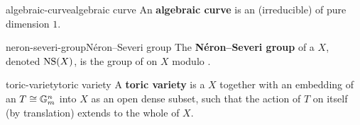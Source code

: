 \begin{topic}{algebraic-curve}{algebraic curve}
    An \textbf{algebraic curve} is an (irreducible)  of pure dimension $1$.
\end{topic}

\begin{topic}{neron-severi-group}{Néron--Severi group}
    The \textbf{Néron--Severi group} of a  $X$, denoted $\textup{NS}(X)$, is the group of  on $X$ modulo .
\end{topic}

\begin{topic}{toric-variety}{toric variety}
    A \textbf{toric variety} is a  $X$ together with an embedding of an  $T \cong \mathbb{G}_m^n$ into $X$ as an open dense subset, such that the action of $T$ on itself (by translation) extends to the whole of $X$.
\end{topic}

